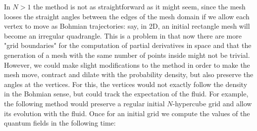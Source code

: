\documentclass[11pt, a4paper]{article} %
\begin{document}
In $N>1$ the method is not as straightforward as it might seem, since the mesh looses the straight angles between the edges of the mesh domain if we allow each vertex to move as Bohmian trajectories: say, in 2D, an initial rectangle mesh will become an irregular quadrangle. This is a problem in that now there are more "grid boundaries" for the computation of partial derivatives in space and that the generation of a mesh with the same number of points inside might not be trivial. However, we could make slight modifications to the method in order to make the mesh move, contract and dilate with the probability density, but also preserve the angles at the vertices. For this, the vertices would not exactly follow the density in the Bohmian sense, but could track the expectation of the fluid. For example, the following method would preserve a regular initial $N$-hypercube grid and allow its evolution with the fluid. Once for an initial grid we compute the values of the quantum fields in the following time:
\end{document}
